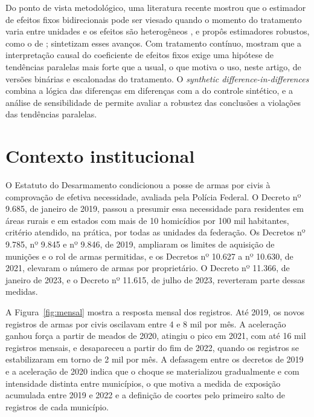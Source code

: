 \documentclass[11pt,a4paper]{article}
\begin{document}
Do ponto de vista metodológico, uma literatura recente mostrou que o estimador de efeitos fixos bidirecionais pode ser viesado quando o momento do tratamento varia entre unidades e os efeitos são heterogêneos \citep{goodmanbacon2021,dechaisemartin2020,sun2021}, e propôs estimadores robustos, como o de \citet{callaway2021}; \citet{roth2023} sintetizam esses avanços. Com tratamento contínuo, \citet{callaway2024} mostram que a interpretação causal do coeficiente de efeitos fixos exige uma hipótese de tendências paralelas mais forte que a usual, o que motiva o uso, neste artigo, de versões binárias e escalonadas do tratamento. O \textit{synthetic difference-in-differences} \citep{arkhangelsky2021} combina a lógica das diferenças em diferenças com a do controle sintético, e a análise de sensibilidade de \citet{rambachan2023} permite avaliar a robustez das conclusões a violações das tendências paralelas.

\section{Contexto institucional}\label{sec:contexto}

O Estatuto do Desarmamento condicionou a posse de armas por civis à comprovação de efetiva necessidade, avaliada pela Polícia Federal. O Decreto nº 9.685, de janeiro de 2019, passou a presumir essa necessidade para residentes em áreas rurais e em estados com mais de 10 homicídios por 100 mil habitantes, critério atendido, na prática, por todas as unidades da federação. Os Decretos nº 9.785, nº 9.845 e nº 9.846, de 2019, ampliaram os limites de aquisição de munições e o rol de armas permitidas, e os Decretos nº 10.627 a nº 10.630, de 2021, elevaram o número de armas por proprietário. O Decreto nº 11.366, de janeiro de 2023, e o Decreto nº 11.615, de julho de 2023, reverteram parte dessas medidas.

A Figura~\ref{fig:mensal} mostra a resposta mensal dos registros. Até 2019, os novos registros de armas por civis oscilavam entre 4 e 8 mil por mês. A aceleração ganhou força a partir de meados de 2020, atingiu o pico em 2021, com até 16 mil registros mensais, e desapareceu a partir do fim de 2022, quando os registros se estabilizaram em torno de 2 mil por mês. A defasagem entre os decretos de 2019 e a aceleração de 2020 indica que o choque se materializou gradualmente e com intensidade distinta entre municípios, o que motiva a medida de exposição acumulada entre 2019 e 2022 e a definição de coortes pelo primeiro salto de registros de cada município.
\end{document}

